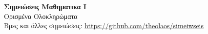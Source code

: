 \documentclass[a4paper,12pt]{article}
\begin{document}
\begin{center}
    \LARGE \textbf{Σημειώσεις Μαθηματικα Ι}\\[1ex]
    \large Ορισμένα Ολοκληρώματα \\
    \normalsize Βρες και άλλες σημειώσεις: \url{https://github.com/theolaos/simeiwseis}
\end{center}
\end{document}

